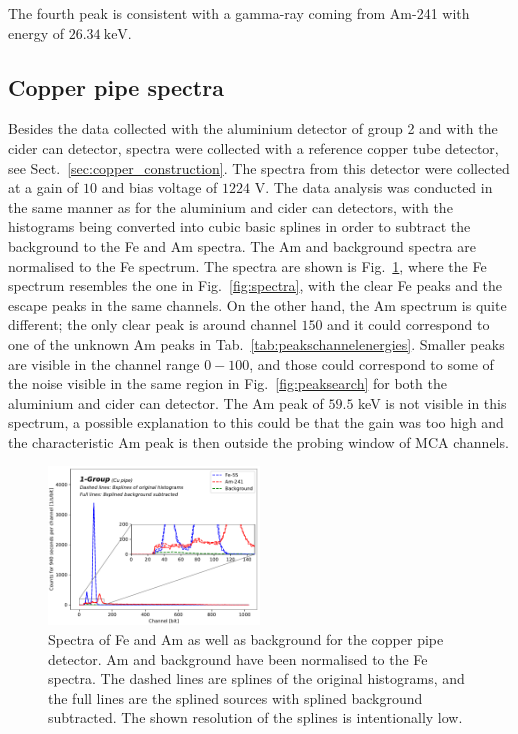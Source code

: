 The fourth peak is consistent with a gamma-ray coming from Am-241 with energy of $\SI{26.34}{\kilo\electronvolt}$.

\subsection{Copper pipe spectra}
Besides the data collected with the aluminium detector of group 2 and with the cider can detector, spectra were collected with a reference copper tube detector, see Sect.~\ref{sec:copper_construction}. The spectra from this detector were collected at a gain of $10$ and bias voltage of $1224$ V. The data analysis was conducted in the same manner as for the aluminium and cider can detectors, with the histograms being converted into cubic basic splines in order to subtract the background to the Fe and Am spectra. The Am and background spectra are normalised to the Fe spectrum. The spectra are shown is Fig.~\ref{fig:copperpipepeaks}, where the Fe spectrum resembles the one in Fig.~\ref{fig:spectra}, with the clear Fe peaks and the escape peaks in the same channels. On the other hand, the Am spectrum is quite different; the only clear peak is around channel $150$ and it could correspond to one of the unknown Am peaks in Tab.~\ref{tab:peakschannelenergies}. Smaller peaks are visible in the channel range $0-100$, and those could correspond to some of the noise visible in the same region in Fig.~\ref{fig:peaksearch} for both the aluminium and cider can detector. The Am peak of $59.5$ keV is not visible in this spectrum, a possible explanation to this could be that the gain was too high and the characteristic Am peak is then outside the probing window of MCA channels.

\begin{figure}[htbp]
  \includegraphics[width=0.5\textwidth]{graphics/cupbkgsubtraction.pdf}
  \caption{Spectra of Fe and Am as well as background for the copper pipe detector. Am and background have been normalised to the Fe spectra. The dashed lines are splines of the original histograms, and the full lines are the splined sources with splined background subtracted. The shown resolution of the splines is intentionally low.}
  \label{fig:copperpipepeaks}
\end{figure}
